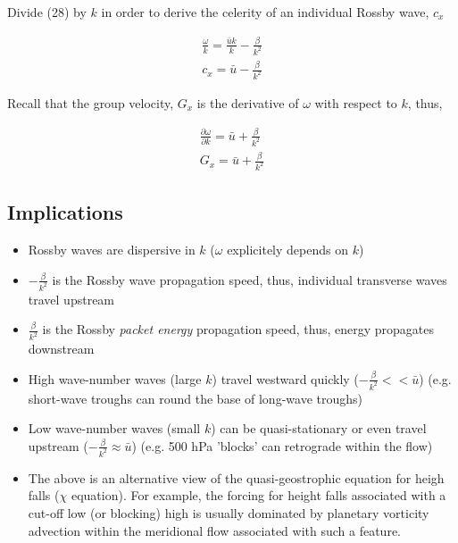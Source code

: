 \documentclass[a4paper,12pt]{article}
\begin{document}
Divide (28) by $k$ in order to derive the celerity of an individual Rossby wave, $c_x$

\begin{align}
\frac{\omega}{k} = \frac{\bar{u}k}{k} - \frac{\beta}{k^2}\\
\boxed{c_x = \bar{u} - \frac{\beta}{k^2}}
\end{align}

Recall that the group velocity, $G_x$ is the derivative of $\omega$ with respect to $k$, thus,

\begin{align}
\frac{\partial \omega}{\partial k} = \bar{u} + \frac{\beta}{k^2}\\
\boxed{G_x = \bar{u} + \frac{\beta}{k^2}}
\end{align}


\subsection*{Implications}

\begin{itemize}
	\item Rossby waves are dispersive in $k$ ($\omega$ explicitely depends on $k$)
	\item $-\frac{\beta}{k^2}$ is the Rossby wave propagation speed, thus, individual transverse waves travel upstream
	\item $\frac{\beta}{k^2}$ is the Rossby \emph{packet energy} propagation speed, thus, energy propagates downstream
	\item High wave-number waves (large $k$) travel westward quickly ($-\frac{\beta}{k^2} << \bar{u}$) (e.g. short-wave troughs can round the base of long-wave troughs)
	\item Low wave-number waves (small $k$) can be quasi-stationary or even travel upstream ($-\frac{\beta}{k^2} \approx \bar{u}$) (e.g. 500 hPa 'blocks' can retrograde within the flow)
	\item The above is an alternative view of the quasi-geostrophic equation for heigh falls ($\chi$ equation). For example, the forcing for height falls associated with a cut-off low (or blocking) high is usually dominated by planetary vorticity advection within the meridional flow associated with such a feature.
\end{itemize}
	
\end{document}
